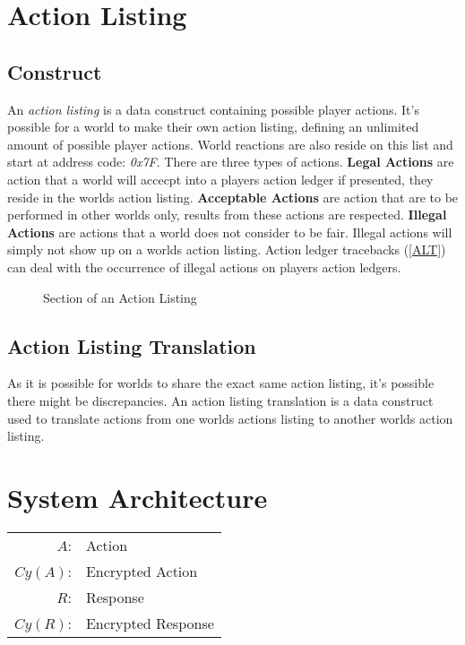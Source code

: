 \documentclass[runningheads,a4paper]{llncs}
\begin{document}
\section{Action Listing} %
\subsection{Construct}
An \textit{action listing} is a data construct containing possible player actions. It's possible for a world to make their own action listing, defining an unlimited amount of possible player actions. World reactions are also reside on this list and start at address code: \textit{0x7F}. There are three types of actions. \textbf{Legal Actions} are action that a world will accecpt into a players action ledger if presented, they reside in the worlds action listing. \textbf{Acceptable Actions} are action that are to be performed in other worlds only, results from these actions are respected. \textbf{Illegal Actions} are actions that a world does not consider to be fair. Illegal actions will simply not show up on a worlds action listing. Action ledger tracebacks (\ref{ALT}) can deal with the occurrence of illegal actions on players action ledgers. 

\begin{figure}
\caption{Section of an Action Listing}
\label{CodeAL}

\end{figure}

\subsection{Action Listing Translation}
As it is possible for worlds to share the exact same action listing, it's possible there might be discrepancies. An action listing translation is a data construct used to translate actions from one worlds actions listing to another worlds action listing.


\section{System Architecture}
\begin{center}
\begin{tabular}{r l}
$A$: & Action\\ 
$Cy(A)$: & Encrypted Action\\
$R$: & Response\\ 
$Cy(R)$: & Encrypted Response\\

\end{tabular}
\end{center}
\end{document}
